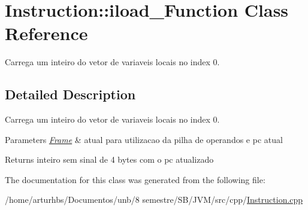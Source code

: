 \hypertarget{classInstruction_1_1iload__0Function}{}\section{Instruction\+:\+:iload\+\_\+Function Class Reference}
\label{classInstruction_1_1iload__0Function}


Carrega um inteiro do vetor de variaveis locais no index 0.  




\subsection{Detailed Description}
Carrega um inteiro do vetor de variaveis locais no index 0. 


\begin{DoxyParams}{Parameters}
{\em \hyperlink{classFrame}{Frame}} & atual para utilizacao da pilha de operandos e pc atual \\
\hline
\end{DoxyParams}
\begin{DoxyReturn}{Returns}
inteiro sem sinal de 4 bytes com o pc atualizado 
\end{DoxyReturn}


The documentation for this class was generated from the following file\+:\begin{DoxyCompactItemize}
\item 
/home/arturhbs/\+Documentos/unb/8 semestre/\+S\+B/\+J\+V\+M/src/cpp/\hyperlink{Instruction_8cpp}{Instruction.\+cpp}\end{DoxyCompactItemize}
